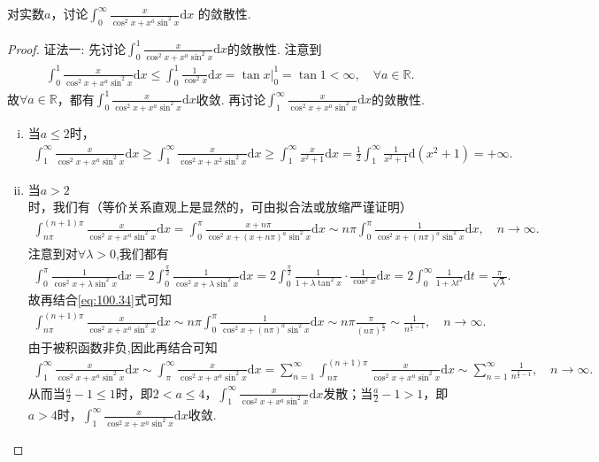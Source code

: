 \documentclass[../../main.tex]{subfiles}%
\begin{document}
\begin{example}
对实数\(a\)，讨论$\int_{0}^{\infty}\frac{x}{\cos^{2}x + x^{a}\sin^{2}x}\mathrm{d}x$
的敛散性. 
\end{example}
\begin{proof}

{\color{blue}证法一:}
先讨论$\int_0^1\frac{x}{\cos^2x+x^a\sin^2x}\mathrm{d}x$的敛散性. 注意到
\begin{align*}
\int_0^1\frac{x}{\cos^2x+x^a\sin^2x}\mathrm{d}x\leqslant \int_0^1\frac{1}{\cos^2x}\mathrm{d}x=\tan x \Big |_{0}^{1}=\tan 1<\infty,\quad \forall a\in \mathbb{R}.
\end{align*}
故$\forall a\in \mathbb{R}$，都有$\int_0^1\frac{x}{\cos^2x+x^a\sin^2x}\mathrm{d}x$收敛.
再讨论$\int_1^{\infty}\frac{x}{\cos^2x+x^a\sin^2x}\mathrm{d}x$的敛散性.
\begin{enumerate}[(i)]
\item 当$a\leqslant 2$时，
\begin{align*}
\int_1^{\infty}\frac{x}{\cos^2x+x^a\sin^2x}\mathrm{d}x\geqslant \int_1^{\infty}\frac{x}{\cos^2x+x^2\sin^2x}\mathrm{d}x\geqslant \int_1^{\infty}\frac{x}{x^2+1}\mathrm{d}x=\frac{1}{2}\int_1^{\infty}\frac{1}{x^2+1}\mathrm{d}(x^2+1)=+\infty.
\end{align*}
\item 当$a>2$时，我们有（等价关系直观上是显然的，可由拟合法或放缩严谨证明）
\begin{align}
\int_{n\pi}^{(n+1)\pi}\frac{x}{\cos^2x+x^a\sin^2x}\mathrm{d}x=\int_0^{\pi}\frac{x+n\pi}{\cos^2x+(x+n\pi)^a\sin^2x}\mathrm{d}x\sim n\pi \int_0^{\pi}\frac{1}{\cos^2x+(n\pi)^a\sin^2x}\mathrm{d}x,\quad n\rightarrow \infty.\label{eq:100.34}
\end{align}
注意到对$\forall \lambda >0$,我们都有
\begin{align*}
\int_0^{\pi}\frac{1}{\cos^2x+\lambda \sin^2x}\mathrm{d}x=2\int_0^{\frac{\pi}{2}}\frac{1}{\cos^2x+\lambda \sin^2x}\mathrm{d}x=2\int_0^{\frac{\pi}{2}}\frac{1}{1+\lambda \tan^2x}\cdot \frac{1}{\cos^2x}\mathrm{d}x=2\int_0^{\infty}\frac{1}{1+\lambda t^2}\mathrm{d}t=\frac{\pi}{\sqrt{\lambda}}.
\end{align*}
故再结合\eqref{eq:100.34}式可知
\begin{align*}
\int_{n\pi}^{(n+1)\pi}\frac{x}{\cos^2x+x^a\sin^2x}\mathrm{d}x\sim n\pi \int_0^{\pi}\frac{1}{\cos^2x+(n\pi)^a\sin^2x}\mathrm{d}x\sim n\pi \frac{\pi}{(n\pi)^{\frac{a}{2}}}\sim \frac{1}{n^{\frac{a}{2}-1}},\quad n\rightarrow \infty.
\end{align*}
由于被积函数非负,因此再结合可知
\begin{align*}
\int_1^{\infty}\frac{x}{\cos^2x+x^a\sin^2x}\mathrm{d}x\sim \int_{\pi}^{\infty}\frac{x}{\cos^2x+x^a\sin^2x}\mathrm{d}x=\sum_{n=1}^{\infty}\int_{n\pi}^{(n+1)\pi}\frac{x}{\cos^2x+x^a\sin^2x}\mathrm{d}x\sim \sum_{n=1}^{\infty}\frac{1}{n^{\frac{a}{2}-1}},\quad n\rightarrow \infty.
\end{align*}
从而当$\frac{a}{2}-1\leqslant 1$时，即$2<a\leqslant 4$，$\int_1^{\infty}\frac{x}{\cos^2x+x^a\sin^2x}\mathrm{d}x$发散；当$\frac{a}{2}-1>1$，即$a>4$时，$\int_1^{\infty}\frac{x}{\cos^2x+x^a\sin^2x}\mathrm{d}x$收敛.
\end{enumerate}


\end{proof}
\end{document}
